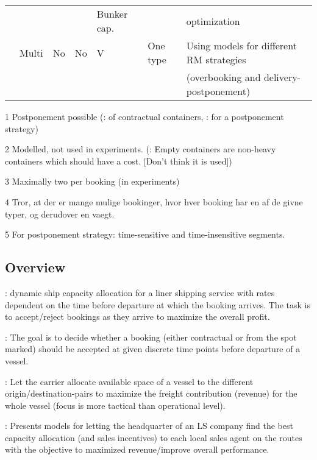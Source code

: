 {\begin{landscape}
\begin{table}[width=0.95\linewidth,cols=7,pos=p]
\begin{footnotesize}
\begin{threeparttable}
\begin{tabular*}{\tblwidth}{@{} *{7}{L} @{}}
					&						&			&			& Bunker cap.	& 										& optimization \\
\citet{Wang19b}		& Multi 				& No	& No		& V				& One type						& Using models for different RM strategies \\
					&						&			&			& 				&										& (overbooking and delivery-postponement)\\
\bottomrule
\end{tabular*}
\begin{tablenotes}\scriptsize
\item[1] Postponement possible (\citet{Lee07}: of contractual containers, \citet{Wang19b}: for a postponement strategy)
\item[2] Modelled, not used in experiments. (\citet{Bingzhou08}: Empty containers are non-heavy containers which should have a cost. [Don’t think it is used])
\item[3] Maximally two per booking (in experiments)
\item[4] Tror, at der er mange mulige bookinger, hvor hver booking har en af de givne typer, og derudover en vaegt.
\item[5] For postponement strategy: time-sensitive and time-insensitive segments.
\end{tablenotes}
\end{threeparttable}
\end{footnotesize}
\end{table}
\end{landscape}
}

\subsection{Overview}
\citet{Maragos94}: dynamic ship capacity allocation for a liner shipping service with rates dependent on the time before departure at which the booking arrives. The task is to accept/reject bookings as they arrive to maximize the overall profit. 

\citet{Lee07}: The goal is to decide whether a booking (either contractual or from the spot marked) should be accepted at given discrete time points before departure of a vessel.   

\citet{Ting04}: Let the carrier allocate available space of a vessel to the different origin/destination-pairs to maximize the freight contribution (revenue) for the whole vessel (focus is more tactical than operational level). 

\citet{Demirag07}: Presents models for letting the headquarter of an LS company find the best capacity allocation (and sales incentives) to each local sales agent on the routes with the objective to maximized revenue/improve overall performance.

